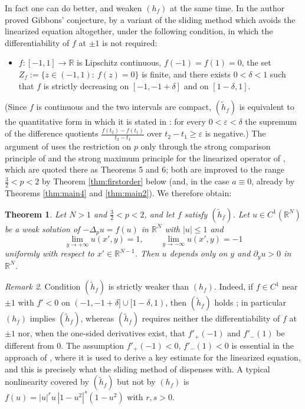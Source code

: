 \documentclass[reqno]{amsart}
\theoremstyle{plain}
\newtheorem{theorem}{Theorem}
\theoremstyle{definition}
\theoremstyle{remark}
\newtheorem{remark}[theorem]{Remark}
\newcommand{\R}{\mathbb{R}}
\newcommand{\eps}{\varepsilon}
\begin{document}
In fact one can do better, and weaken $(h_f)$ at the same time. In \cite{LeFM} the author proved
Gibbons' conjecture, by a variant of the sliding method which avoids the linearized equation
altogether, under the following condition, in which the differentiability of $f$ at $\pm1$ is not
required:
\begin{itemize}[leftmargin=2.6em]
\item[$(\tilde h_f)$] $f:[-1,1]\to\R$ is Lipschitz continuous, $f(-1)=f(1)=0$, the set
$Z_f:=\{z\in(-1,1):\ f(z)=0\}$ is finite, and there exists $0<\delta<1$ such that $f$ is strictly
decreasing on $[-1,-1+\delta]$ and on $[1-\delta,1]$.
\end{itemize}
(Since $f$ is continuous and the two intervals are compact, $(\tilde h_f)$ is equivalent to the
quantitative form in which it is stated in \cite{LeFM}: for every $0<\eps<\delta$ the supremum of the
difference quotients $\frac{f(t_2)-f(t_1)}{t_2-t_1}$ over $t_2-t_1\ge\eps$ is negative.) The argument of \cite{LeFM} uses the restriction on $p$ only through the strong
comparison principle of \cite[Theorem 1.2]{MMS} and the strong maximum principle for the linearized
operator of \cite[Theorem 1.4]{Mon}, which are quoted there as Theorems 5 and 6; both are improved
to the range $\frac32<p<2$ by Theorem \ref{thm:firstorder} below (and, in the case $a\equiv0$,
already by Theorems \ref{thm:main4} and \ref{thm:main2}). We therefore obtain:

\begin{theorem}\label{thm:gibbons}
Let $N>1$ and $\frac32<p<2$, and let $f$ satisfy $(\tilde h_f)$. Let $u\in C^1(\R^N)$ be a weak
solution of $-\Delta_pu=f(u)$ in $\R^N$ with $|u|\le1$ and
\[
\lim_{y\to+\infty}u(x',y)=1,\qquad \lim_{y\to-\infty}u(x',y)=-1
\]
uniformly with respect to $x'\in\R^{N-1}$. Then $u$ depends only on $y$ and $\partial_yu>0$ in
$\R^N$.
\end{theorem}

\begin{remark}
Condition $(\tilde h_f)$ is strictly weaker than $(h_f)$. Indeed, if $f\in C^1$ near $\pm1$ with
$f'<0$ on $(-1,-1+\delta]\cup[1-\delta,1)$, then $(\tilde h_f)$ holds
\cite[Remark 2]{LeFM}; in particular $(h_f)$ implies $(\tilde h_f)$, whereas $(\tilde h_f)$ requires
neither the differentiability of $f$ at $\pm1$ nor, when the one-sided derivatives exist, that
$f'_+(-1)$ and $f'_-(1)$ be different from $0$. The assumption
$f'_+(-1)<0$, $f'_-(1)<0$ is essential in the approach of \cite{EFMS1}, where it is used to derive a
key estimate for the linearized equation, and this is precisely what the sliding method of
\cite{LeFM} dispenses with. A typical nonlinearity covered by $(\tilde h_f)$ but not by $(h_f)$ is
$f(u)=|u|^{r}u\,|1-u^2|^{s}(1-u^2)$ with $r,s>0$.
\end{remark}
\end{document}
